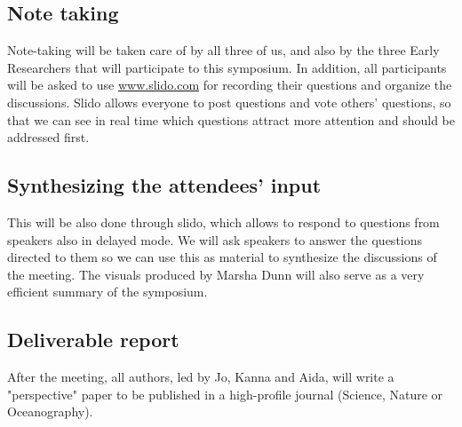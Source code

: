  

\subsection{Note taking}
Note-taking will be taken care of by all three of us, and also by the three Early Researchers that will participate to this symposium. In addition, all participants will be asked to use \url{www.slido.com} for recording their questions and organize the discussions. Slido allows everyone to post questions and vote others' questions, so that we can see in real time which questions attract more attention and should be addressed first.\\
 

 

\subsection{Synthesizing the attendees’ input}
This will be also done through slido, which allows to respond to questions from speakers also in delayed mode. We will ask speakers to answer the questions directed to them so we can use this as material to synthesize the discussions of the meeting. The visuals produced by Marsha Dunn will also serve as a very efficient summary of the symposium.\\

 

\subsection{Deliverable report}
After the meeting, all authors, led by Jo, Kanna and Aida, will write a "perspective" paper to be published in a high-profile journal (Science, Nature or Oceanography).\\

